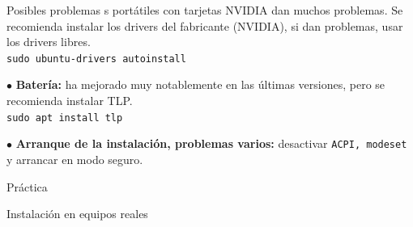 \documentclass[12pt]{beamer}
\begin{document}
\begin{frame}{Posibles problemas}
s portátiles con tarjetas NVIDIA dan muchos problemas. Se recomienda instalar los drivers del fabricante (NVIDIA), si dan problemas, usar los drivers libres.\\
	\hfill \texttt{sudo ubuntu-drivers autoinstall}
	
	$\bullet$ \textbf{Batería:} ha mejorado muy notablemente en las últimas versiones, pero se recomienda instalar TLP.\\
	\hfill \texttt{sudo apt install tlp}
	
	$\bullet$ \textbf{Arranque de la instalación, problemas varios:} desactivar \texttt{ACPI, modeset} y arrancar en modo seguro.
\end{frame}

\begin{frame}{Práctica}
\end{frame}

\begin{frame}{Instalación en equipos reales}
\end{frame}
\end{document}
